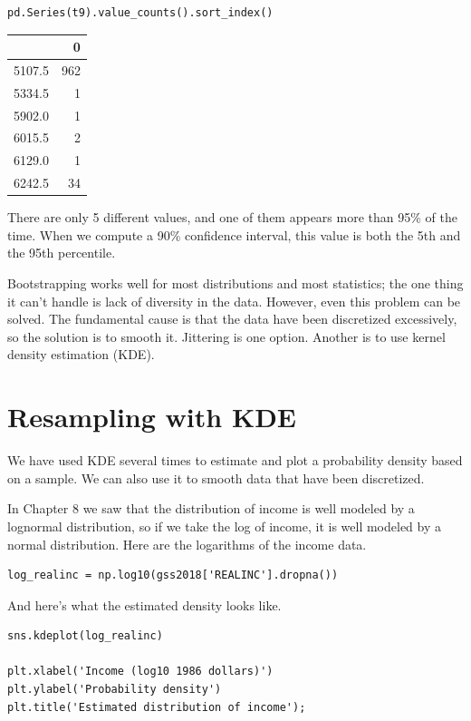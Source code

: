 \begin{lstlisting}[]
pd.Series(t9).value_counts().sort_index()
\end{lstlisting}

\begin{tabular}{lr}
\midrule
{} &    0 \\
\midrule
5107.5 &  962 \\
5334.5 &    1 \\
5902.0 &    1 \\
6015.5 &    2 \\
6129.0 &    1 \\
6242.5 &   34 \\
\midrule
\end{tabular}

There are only 5 different values, and one of them appears more than
95\% of the time. When we compute a 90\% confidence interval, this value
is both the 5th and the 95th percentile.

Bootstrapping works well for most distributions and most statistics; the
one thing it can't handle is lack of diversity in the data. However,
even this problem can be solved. The fundamental cause is that the data
have been discretized excessively, so the solution is to smooth it.
Jittering is one option. Another is to use kernel density estimation
(KDE).

\hypertarget{resampling-with-kde}{%
\section{Resampling with KDE}\label{resampling-with-kde}}

We have used KDE several times to estimate and plot a probability
density based on a sample. We can also use it to smooth data that have
been discretized.

In Chapter 8 we saw that the distribution of income is well modeled by a
lognormal distribution, so if we take the log of income, it is well
modeled by a normal distribution. Here are the logarithms of the income
data.

\begin{lstlisting}[]
log_realinc = np.log10(gss2018['REALINC'].dropna())
\end{lstlisting}

And here's what the estimated density looks like.

\begin{lstlisting}[]
sns.kdeplot(log_realinc)

plt.xlabel('Income (log10 1986 dollars)')
plt.ylabel('Probability density')
plt.title('Estimated distribution of income');
\end{lstlisting}

